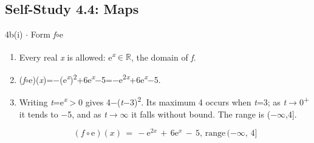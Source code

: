 \documentclass[11pt]{article}
\begin{document}
\begin{keepsection}\subsection{Self-Study 4.4: Maps}

\begin{workedbox}{4b(i) \ensuremath{\cdot} Form \textit{f}\ensuremath{\circ}e}
\begin{enumerate}
\item Every real \textit{x} is allowed: e\textsuperscript{\textit{x}}\ensuremath{\in}\ensuremath{\mathbb{R}}, the domain of \textit{f}.
\item (\textit{f}\ensuremath{\circ}e)(\textit{x})=\ensuremath{-}(e\textsuperscript{\textit{x}})\textsuperscript{2}+6e\textsuperscript{\textit{x}}\ensuremath{-}5=\ensuremath{-}e\textsuperscript{2\textit{x}}+6e\textsuperscript{\textit{x}}\ensuremath{-}5.
\item {}
Writing \textit{t}=e\textsuperscript{\textit{x}}\ensuremath{>}0 gives 4\ensuremath{-}(\textit{t}\ensuremath{-}3)\textsuperscript{2}. Its maximum 4 occurs when \textit{t}=3; as \textit{t}\ensuremath{\to}0\textsuperscript{+} it tends to \ensuremath{-}5, and as \textit{t}\ensuremath{\to}\ensuremath{\infty} it falls without bound. The range is (\ensuremath{-}\ensuremath{\infty},4].

\begin{equation*}({f}\circ \mathrm{e})({x})\, =\, -\mathrm{e}^{2{x}}\, +\, 6\mathrm{e}^{{x}}\, -\, 5,\, \text{range}\, (-\infty ,\, 4]\end{equation*}
\end{enumerate}
\end{workedbox}

\end{keepsection}
\end{document}
